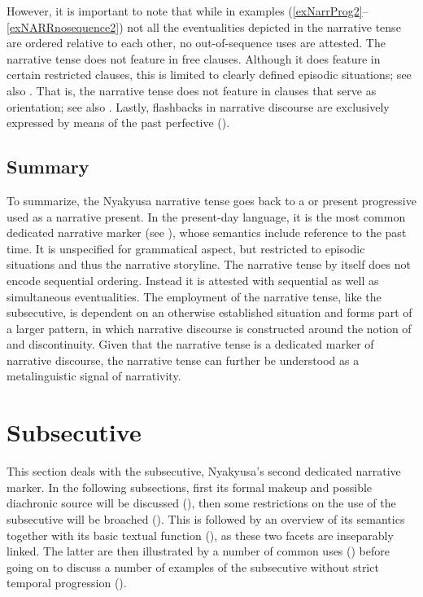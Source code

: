 However, it is important to note that while in examples (\ref{exNarrProg2}--\ref{exNARRnosequence2}) not all the eventualities depicted in the narrative tense are ordered relative to each other, no out-of-sequence uses are attested. The narrative tense does not feature in free clauses.  Although it does feature in certain restricted clauses, this is limited to clearly defined episodic situations; see also . That is, the narrative tense does not feature in clauses that serve as orientation; see also . Lastly, flashbacks in narrative discourse are exclusively expressed by means of the past perfective ().
\subsection{Summary}
To summarize, the Nyakyusa narrative tense goes back to a  or present progressive used as a narrative present. In the present-day language, it is the most common dedicated narrative marker (see ), whose semantics include reference to the past time. It is unspecified for grammatical aspect, but restricted to episodic situations and thus the narrative storyline. The narrative tense by itself does not encode sequential ordering. Instead it is attested with sequential as well as simultaneous eventualities. The employment of the narrative tense, like the subsecutive, is dependent on an otherwise established situation and forms part of a larger pattern, in which narrative discourse is constructed around the notion of  and discontinuity.  Given that the narrative tense is a dedicated marker of narrative  discourse, the narrative tense can further be understood as a metalinguistic signal of narrativity.
\section{Subsecutive}\label{Subsecutive}
This section deals with the subsecutive, Nyakyusa's second dedicated narrative marker. In the following subsections, first its formal makeup and possible diachronic source will be discussed (), then some restrictions on the use of the subsecutive will be broached (). This is followed by an overview of its semantics together with its basic textual function (), as these two facets are inseparably linked. The latter are then illustrated by a number of common uses () before going on to discuss a number of examples of the subsecutive without strict temporal progression ().
